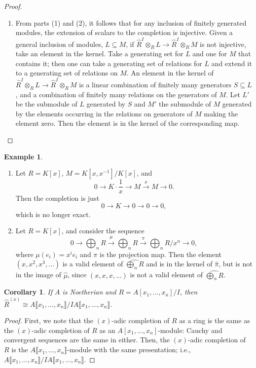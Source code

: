 \documentclass{amsart}[12pt]
\numberwithin{equation}{section}
\theoremstyle{plain} %
\newtheorem{cor}[equation]{Corollary}
\theoremstyle{definition}
\newtheorem{ex}[equation]{Example}
\theoremstyle{remark}
\newcommand{\xra}[1]{\xrightarrow{#1}}
\begin{document}
\begin{proof}
\begin{enumerate}
\item From parts (1) and (2), it follows that for any inclusion of finitely generated modules, the extension of scalars to the completion is injective. Given a general inclusion of modules, $L \subseteq M$, if $\hat{R}^I \otimes_R L \to \hat{R}^I \otimes_R M$ is not injective, take an element in the kernel. Take a generating set for $L$ and one for $M$ that contains it; then one can take a generating set of relations for $L$ and extend it to a generating set of relations on $M$. An element in the kernel of $\hat{R}^I \otimes_R L \to \hat{R}^I \otimes_R M$ is a linear combination of finitely many generators $S\subseteq L$, and a combination of finitely many relations on the generators of $M$. Let $L'$ be the submodule of $L$ generated by $S$ and $M'$ the submodule of $M$ generated by the elements occurring in the relations on generators of $M$ making the element zero. Then the element is in the kernel of the corresponding map.\qedhere
\end{enumerate}
	\end{proof}
	
	\begin{ex} 
\begin{enumerate}
\item Let $R=K[x]$, $M=K[x,x^{-1}]/K[x]$, and
\[ 0 \to K\cdot \frac{1}{x} \to M \xra{x} M \to 0.\]
Then the completion is just
\[ 0 \to K \to 0 \to 0 \to 0,\]
which is no longer exact.
\item	Let $R=K[x]$, and consider the sequence
	\[ 0 \to \bigoplus_n R \xra{\mu}  \bigoplus_n R \xra{\pi}  \bigoplus_n R/x^n \to 0,\]
	where $\mu(e_i) = x^i e_i$ and $\pi$ is the projection map. 
	Then the element $(x,x^2,x^3,\dots)$ is a valid element of $\widehat{ \bigoplus_n R}$ and is in the kernel of $\hat{\pi}$, but is not in the image of $\hat{\mu}$, since $(x,x,x,\dots)$ is not a valid element of $\widehat{ \bigoplus_n R}$.
	\end{enumerate}
	\end{ex}

 
 \begin{cor} If $A$ is Noetherian and $R=A[ x_1,\dots,x_n]/I$, then $\hat{R}^{(x)} \cong A\llbracket x_1,\dots,x_n\rrbracket/IA\llbracket x_1,\dots,x_n\rrbracket$.
\end{cor}
\begin{proof}
First, we note that the $(x)$-adic completion of $R$ as a ring is the same as the $(x)$-adic completion of $R$ as an $A[x_1,\dots,x_n]$-module:  Cauchy and convergent sequences are the same in either.
 Then, the $(x)$-adic completion of $R$ is the $A\llbracket x_1,\dots,x_n\rrbracket$-module with the same presentation; i.e., $A\llbracket x_1,\dots,x_n\rrbracket/IA\llbracket x_1,\dots,x_n\rrbracket$. 
 \end{proof}
 
\end{document}
